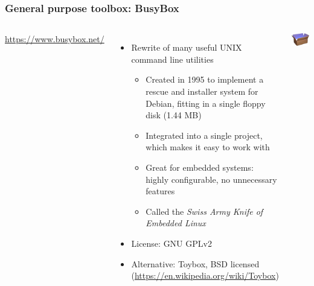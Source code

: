 \begin{frame}
  \frametitle{General purpose toolbox: BusyBox}
  \begin{columns}
      \url{https://www.busybox.net/}
      \begin{itemize}
      \item Rewrite of many useful UNIX command line utilities
        \begin{itemize}
        \item Created in 1995 to implement a rescue and installer
         system for Debian, fitting in a single floppy disk (1.44 MB)
        \item Integrated into a single project, which makes it easy to
          work with
        \item Great for embedded systems: highly configurable,
          no unnecessary features
        \item Called the {\em Swiss Army Knife of Embedded Linux}
        \end{itemize}
      \item License: GNU GPLv2
      \item Alternative: Toybox, BSD licensed (\url{https://en.wikipedia.org/wiki/Toybox})
      \end{itemize}
    \includegraphics[width=\textwidth]{common/pictures/busybox.png}
  \end{columns}
\end{frame}

